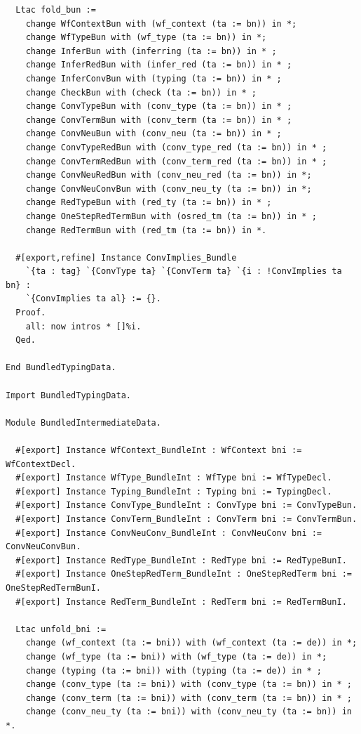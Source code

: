 \documentclass[10pt,a4paper]{amsart}
\begin{document}
\begin{lstlisting}
  Ltac fold_bun :=
    change WfContextBun with (wf_context (ta := bn)) in *;
    change WfTypeBun with (wf_type (ta := bn)) in *;
    change InferBun with (inferring (ta := bn)) in * ;
    change InferRedBun with (infer_red (ta := bn)) in * ;
    change InferConvBun with (typing (ta := bn)) in * ;
    change CheckBun with (check (ta := bn)) in * ;
    change ConvTypeBun with (conv_type (ta := bn)) in * ;
    change ConvTermBun with (conv_term (ta := bn)) in * ;
    change ConvNeuBun with (conv_neu (ta := bn)) in * ;
    change ConvTypeRedBun with (conv_type_red (ta := bn)) in * ;
    change ConvTermRedBun with (conv_term_red (ta := bn)) in * ;
    change ConvNeuRedBun with (conv_neu_red (ta := bn)) in *;
    change ConvNeuConvBun with (conv_neu_ty (ta := bn)) in *;
    change RedTypeBun with (red_ty (ta := bn)) in * ;
    change OneStepRedTermBun with (osred_tm (ta := bn)) in * ;
    change RedTermBun with (red_tm (ta := bn)) in *.

  #[export,refine] Instance ConvImplies_Bundle
    `{ta : tag} `{ConvType ta} `{ConvTerm ta} `{i : !ConvImplies ta bn} : 
    `{ConvImplies ta al} := {}.
  Proof.
    all: now intros * []%i.
  Qed.

End BundledTypingData.

Import BundledTypingData.

Module BundledIntermediateData.

  #[export] Instance WfContext_BundleInt : WfContext bni := WfContextDecl.
  #[export] Instance WfType_BundleInt : WfType bni := WfTypeDecl.
  #[export] Instance Typing_BundleInt : Typing bni := TypingDecl.
  #[export] Instance ConvType_BundleInt : ConvType bni := ConvTypeBun.
  #[export] Instance ConvTerm_BundleInt : ConvTerm bni := ConvTermBun.
  #[export] Instance ConvNeuConv_BundleInt : ConvNeuConv bni := ConvNeuConvBun.
  #[export] Instance RedType_BundleInt : RedType bni := RedTypeBunI.
  #[export] Instance OneStepRedTerm_BundleInt : OneStepRedTerm bni := OneStepRedTermBunI.
  #[export] Instance RedTerm_BundleInt : RedTerm bni := RedTermBunI.

  Ltac unfold_bni :=
    change (wf_context (ta := bni)) with (wf_context (ta := de)) in *;
    change (wf_type (ta := bni)) with (wf_type (ta := de)) in *;
    change (typing (ta := bni)) with (typing (ta := de)) in * ;
    change (conv_type (ta := bni)) with (conv_type (ta := bn)) in * ;
    change (conv_term (ta := bni)) with (conv_term (ta := bn)) in * ;
    change (conv_neu_ty (ta := bni)) with (conv_neu_ty (ta := bn)) in *.


\end{lstlisting}
\end{document}
